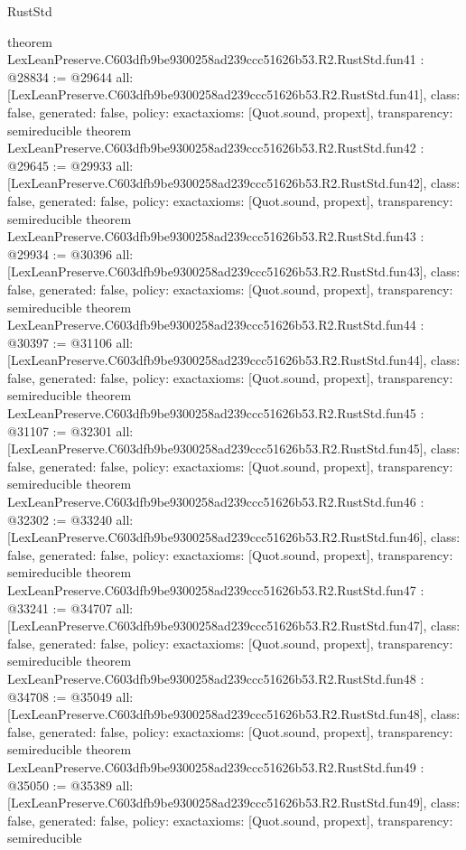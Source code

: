 \begin{lexlean}{RustStd}
\begin{coremodule}
{}
theorem LexLeanPreserve.C603dfb9be9300258ad239ccc51626b53.R2.RustStd.fun41 : @28834 := @29644 {
  all: [LexLeanPreserve.C603dfb9be9300258ad239ccc51626b53.R2.RustStd.fun41],
  class: false,
  generated: false,
  policy: exact{axioms: [Quot.sound, propext]},
  transparency: semireducible
}
theorem LexLeanPreserve.C603dfb9be9300258ad239ccc51626b53.R2.RustStd.fun42 : @29645 := @29933 {
  all: [LexLeanPreserve.C603dfb9be9300258ad239ccc51626b53.R2.RustStd.fun42],
  class: false,
  generated: false,
  policy: exact{axioms: [Quot.sound, propext]},
  transparency: semireducible
}
theorem LexLeanPreserve.C603dfb9be9300258ad239ccc51626b53.R2.RustStd.fun43 : @29934 := @30396 {
  all: [LexLeanPreserve.C603dfb9be9300258ad239ccc51626b53.R2.RustStd.fun43],
  class: false,
  generated: false,
  policy: exact{axioms: [Quot.sound, propext]},
  transparency: semireducible
}
theorem LexLeanPreserve.C603dfb9be9300258ad239ccc51626b53.R2.RustStd.fun44 : @30397 := @31106 {
  all: [LexLeanPreserve.C603dfb9be9300258ad239ccc51626b53.R2.RustStd.fun44],
  class: false,
  generated: false,
  policy: exact{axioms: [Quot.sound, propext]},
  transparency: semireducible
}
theorem LexLeanPreserve.C603dfb9be9300258ad239ccc51626b53.R2.RustStd.fun45 : @31107 := @32301 {
  all: [LexLeanPreserve.C603dfb9be9300258ad239ccc51626b53.R2.RustStd.fun45],
  class: false,
  generated: false,
  policy: exact{axioms: [Quot.sound, propext]},
  transparency: semireducible
}
theorem LexLeanPreserve.C603dfb9be9300258ad239ccc51626b53.R2.RustStd.fun46 : @32302 := @33240 {
  all: [LexLeanPreserve.C603dfb9be9300258ad239ccc51626b53.R2.RustStd.fun46],
  class: false,
  generated: false,
  policy: exact{axioms: [Quot.sound, propext]},
  transparency: semireducible
}
theorem LexLeanPreserve.C603dfb9be9300258ad239ccc51626b53.R2.RustStd.fun47 : @33241 := @34707 {
  all: [LexLeanPreserve.C603dfb9be9300258ad239ccc51626b53.R2.RustStd.fun47],
  class: false,
  generated: false,
  policy: exact{axioms: [Quot.sound, propext]},
  transparency: semireducible
}
theorem LexLeanPreserve.C603dfb9be9300258ad239ccc51626b53.R2.RustStd.fun48 : @34708 := @35049 {
  all: [LexLeanPreserve.C603dfb9be9300258ad239ccc51626b53.R2.RustStd.fun48],
  class: false,
  generated: false,
  policy: exact{axioms: [Quot.sound, propext]},
  transparency: semireducible
}
theorem LexLeanPreserve.C603dfb9be9300258ad239ccc51626b53.R2.RustStd.fun49 : @35050 := @35389 {
  all: [LexLeanPreserve.C603dfb9be9300258ad239ccc51626b53.R2.RustStd.fun49],
  class: false,
  generated: false,
  policy: exact{axioms: [Quot.sound, propext]},
  transparency: semireducible
}
\end{coremodule}
\end{lexlean}
